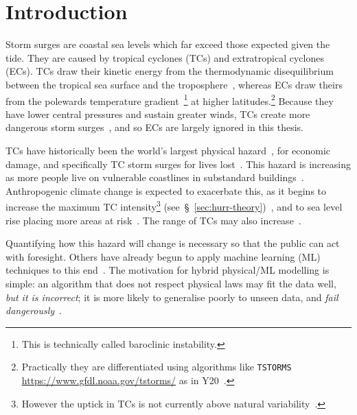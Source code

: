 \section{Introduction}
\label{sec:1_Introduction}


Storm surges are coastal sea levels which far exceed those
expected given the tide.
They are caused by tropical cyclones
(TCs) and extratropical cyclones (ECs).
TCs draw their kinetic energy from the thermodynamic disequilibrium between
the tropical sea surface and the troposphere~\cite{emanuel1986air, emanuel1987dependence},
whereas ECs draw theirs from the
polewards temperature gradient~\cite{lorenz1960energy, holton2004introduction}\footnote{
This is technically called baroclinic instability.} at higher latitudes.\footnote{
Practically they are differentiated using algorithms like \texttt{TSTORMS}
\url{https://www.gfdl.noaa.gov/tstorms/} as in Y20~\cite{ZannaPreprint}.}
Because they have lower central pressures and sustain greater winds,
TCs create more dangerous storm surges~\cite{emanuel2005divine},
and so ECs are largely ignored in this thesis.

TCs have historically been the
world's largest physical hazard~\cite{shultz2005epidemiology},
for economic damage,
and specifically TC storm surges for lives lost~\cite{shultz2005epidemiology,
zhang2009tropical, emanuel2005divine}.
This hazard is increasing as more people live on vulnerable coastlines
in substandard buildings~\cite{emanuel2005divine}.
Anthropogenic climate change is expected to exacerbate this,
as it begins to increase the maximum TC intensity\footnote{
However the uptick in TCs is not currently above
 natural variability~\cite{mendelsohn2012impact}.}
(see~§~\ref{sec:hurr-theory})~\cite{emanuel2008hurricanes,emanuel2017will, nordhaus2010},
and to sea level rise placing more areas at risk~\cite{SROCC}.
The range of TCs may also increase~\cite{emanuel2008hurricanes,
emanuel2017will, fedorov2010tropical, }.

Quantifying how this hazard will change is necessary
so that the public can act with foresight.
Others have already begun to apply machine learning (ML) techniques to this
end~\cite{kulp2019new, kulp2018coastaldem, tadesse2020data}.
The motivation for hybrid physical/ML modelling is simple:
an algorithm that does not respect physical laws
may fit the data well, \textit{but it is incorrect};
it is more likely to generalise poorly to unseen data,
and \textit{fail dangerously}~\cite{beucler2019achieving}.




